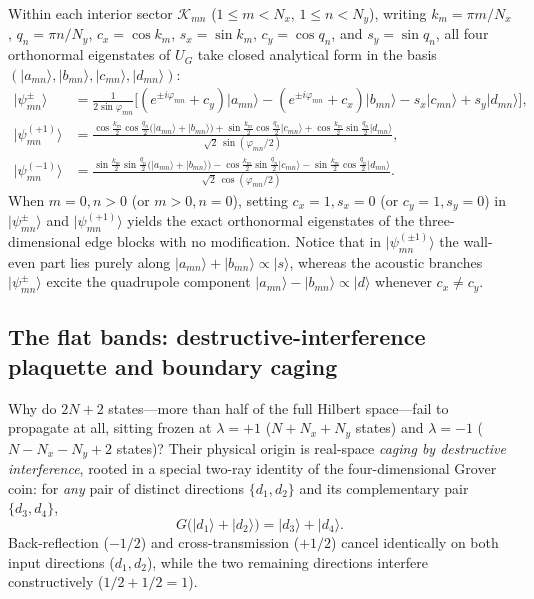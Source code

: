 \documentclass[11pt,a4paper,oneside]{report}
\newcommand{\ket}[1]{\lvert #1\rangle}
\numberwithin{equation}{chapter}
\begin{document}
Within each interior sector \(\mathcal K_{mn}\) (\(1\le m<N_x\),
\(1\le n<N_y\)), writing \(k_m=\pi m/N_x\), \(q_n=\pi n/N_y\),
\(c_x=\cos k_m\), \(s_x=\sin k_m\), \(c_y=\cos q_n\), and \(s_y=\sin q_n\),
all four orthonormal eigenstates of \(U_G\) take closed analytical form in
the basis \((\ket{a_{mn}},\ket{b_{mn}},\ket{c_{mn}},\ket{d_{mn}})\):
\begin{align}
\ket{\psi_{mn}^{\pm}}&=\frac1{2\sin\varphi_{mn}}
\Big[(e^{\pm i\varphi_{mn}}+c_y)\ket{a_{mn}}
-(e^{\pm i\varphi_{mn}}+c_x)\ket{b_{mn}}
-s_x\ket{c_{mn}}+s_y\ket{d_{mn}}\Big],\\
\ket{\psi_{mn}^{(+1)}}&=\frac{\cos\frac{k_m}{2}\cos\frac{q_n}{2}\big(\ket{a_{mn}}+\ket{b_{mn}}\big)
+\sin\frac{k_m}{2}\cos\frac{q_n}{2}\ket{c_{mn}}
+\cos\frac{k_m}{2}\sin\frac{q_n}{2}\ket{d_{mn}}}{\sqrt2\,\sin(\varphi_{mn}/2)},\\
\ket{\psi_{mn}^{(-1)}}&=\frac{\sin\frac{k_m}{2}\sin\frac{q_n}{2}\big(\ket{a_{mn}}+\ket{b_{mn}}\big)
-\cos\frac{k_m}{2}\sin\frac{q_n}{2}\ket{c_{mn}}
-\sin\frac{k_m}{2}\cos\frac{q_n}{2}\ket{d_{mn}}}{\sqrt2\,\cos(\varphi_{mn}/2)}.
\end{align}
When \(m=0,n>0\) (or \(m>0,n=0\)), setting \(c_x=1,s_x=0\) (or
\(c_y=1,s_y=0\)) in \(\ket{\psi_{mn}^{\pm}}\) and \(\ket{\psi_{mn}^{(+1)}}\)
yields the exact orthonormal eigenstates of the three-dimensional edge blocks
with no modification. Notice that in \(\ket{\psi_{mn}^{(\pm1)}}\) the
wall-even part lies purely along \(\ket{a_{mn}}+\ket{b_{mn}}\propto\ket s\),
whereas the acoustic branches \(\ket{\psi_{mn}^\pm}\) excite the quadrupole
component \(\ket{a_{mn}}-\ket{b_{mn}}\propto\ket d\) whenever \(c_x\neq c_y\).

\subsection{The flat bands: destructive-interference plaquette and boundary caging}

Why do \(2N+2\) states---more than half of the full Hilbert space---fail to
propagate at all, sitting frozen at \(\lambda=+1\) (\(N+N_x+N_y\) states)
and \(\lambda=-1\) (\(N-N_x-N_y+2\) states)? Their physical origin is
real-space \emph{caging by destructive interference}, rooted in a special
two-ray identity of the four-dimensional Grover coin: for \emph{any} pair of
distinct directions \(\{d_1,d_2\}\) and its complementary pair
\(\{d_3,d_4\}\),
\begin{equation}
\boxed{
G\big(\ket{d_1}+\ket{d_2}\big)=\ket{d_3}+\ket{d_4}.
}
\label{eq:tworay}
\end{equation}
Back-reflection (\(-1/2\)) and cross-transmission (\(+1/2\)) cancel
identically on both input directions (\(d_1,d_2\)), while the two remaining
directions interfere constructively (\(1/2+1/2=1\)).
\end{document}
